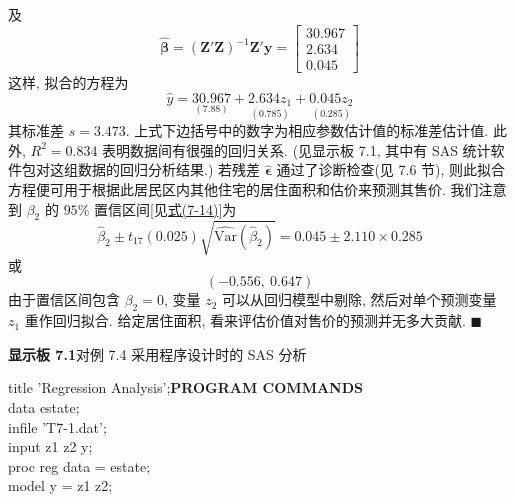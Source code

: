 
及
\[
\hat{\boldsymbol{\beta}}=(\mathbf{Z}'\mathbf{Z})^{-1}\mathbf{Z}'\mathbf{y}
=\begin{bmatrix}30.967\\2.634\\0.045\end{bmatrix}
\]
这样, 拟合的方程为
\[
\hat{y}=\underset{(7.88)}{30.967}+\underset{(0.785)}{2.634z_1}+\underset{(0.285)}{0.045z_2}
\]
其标准差 $s=3.473$. 上式下边括号中的数字为相应参数估计值的标准差估计值. 此外, $R^2=0.834$ 表明数据间有很强的回归关系. (见显示板 7.1, 其中有 SAS 统计软件包对这组数据的回归分析结果.) 若残差 $\hat{\boldsymbol{\epsilon}}$ 通过了诊断检查(见 7.6 节), 则此拟合方程便可用于根据此居民区内其他住宅的居住面积和估价来预测其售价. 我们注意到 $\beta_2$ 的 $95\%$ 置信区间[见\hyperref[eq:7-14]{式(7-14)}]为
\[
\hat{\beta}_2\pm t_{17}(0.025)\sqrt{\widehat{\text{Var}}(\hat{\beta}_2)}=0.045\pm 2.110\times 0.285
\]
或
\[
(-0.556,\ 0.647)
\]
由于置信区间包含 $\beta_2=0$, 变量 $z_2$ 可以从回归模型中剔除, 然后对单个预测变量 $z_1$ 重作回归拟合. 给定居住面积, 看来评估价值对售价的预测并无多大贡献. \hfill$\blacksquare$

\medskip
\noindent\textbf{显示板 7.1}\quad 对例 7.4 采用程序设计时的 SAS 分析

\begin{mvbox}
{\ttfamily\small
title 'Regression Analysis';\hfill\textbf{\rmfamily PROGRAM COMMANDS}\\
data estate;\\
infile 'T7-1.dat';\\
input z1 z2 y;\\
proc reg data = estate;\\
model y = z1 z2;
\par}
\end{mvbox}

